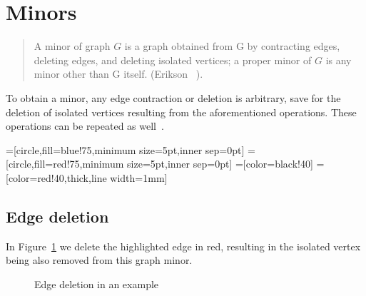 \section{Minors}

\begin{quote}
A minor of graph $ G $ is a graph obtained from G by contracting edges, deleting edges, and deleting isolated vertices; a proper minor of $ G $ is any minor other than G itself. (Erikson ~\autocite{erikson2009topo}).
\end{quote}

To obtain a minor, any edge contraction or deletion is arbitrary, save for the deletion of isolated vertices resulting from the aforementioned operations. These operations can be repeated as well~\autocite{pegg2005minor}.

=[circle,fill=blue!75,minimum size=5pt,inner sep=0pt]
=[circle,fill=red!75,minimum size=5pt,inner sep=0pt]
=[color=black!40]
=[color=red!40,thick,line width=1mm]

\subsection{Edge deletion}

In Figure~\ref{fig:edgedel} we delete the highlighted edge in red, resulting in the isolated vertex being also removed from this graph minor.

\begin{figure}[!ht]
  \centering

  \caption{Edge deletion in an example}
  \label{fig:edgedel}
\end{figure}

